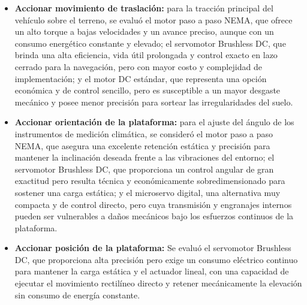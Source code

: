 \begin{itemize}
	\item \textbf{Accionar movimiento de traslación:} para la tracción principal del vehículo sobre el terreno, se evaluó el motor paso a paso NEMA, que ofrece un alto torque a bajas velocidades y un avance preciso, aunque con un consumo energético constante y elevado; el servomotor Brushless DC, que brinda una alta eficiencia, vida útil prolongada y control exacto en lazo cerrado para la navegación, pero con mayor costo y complejidad de implementación; y el motor DC estándar, que representa una opción económica y de control sencillo, pero es susceptible a un mayor desgaste mecánico y posee menor precisión para sortear las irregularidades del suelo.
	
	\item \textbf{Accionar orientación de la plataforma:} para el ajuste del ángulo de los instrumentos de medición climática, se consideró el motor paso a paso NEMA, que asegura una excelente retención estática y precisión para mantener la inclinación deseada frente a las vibraciones del entorno; el servomotor Brushless DC, que proporciona un control angular de gran exactitud pero resulta técnica y económicamente sobredimensionado para sostener una carga estática; y el microservo digital, una alternativa muy compacta y de control directo, pero cuya transmisión y engranajes internos pueden ser vulnerables a daños mecánicos bajo los esfuerzos continuos de la plataforma.
	
	\item \textbf{Accionar posición de la plataforma:} Se evaluó el servomotor Brushless DC, que proporciona alta precisión pero exige un consumo eléctrico continuo para mantener la carga estática y el actuador lineal, con una capacidad de ejecutar el movimiento rectilíneo directo y retener mecánicamente la elevación sin consumo de energía constante.

\end{itemize}
